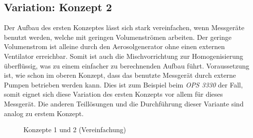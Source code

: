 \subsection{Variation: Konzept 2}
Der Aufbau des ersten Konzeptes l\"{a}sst sich stark vereinfachen, wenn Messger\"{a}te benutzt werden, welche mit geringen Volumenstr\"{o}men arbeiten. Der geringe Volumenstrom ist alleine durch den Aerosolgenerator ohne einen externen Ventilator erreichbar. Somit ist auch die Mischvorrichtung zur Homogenisierung \"{u}berfl\"{u}ssig, was zu einem einfacher zu berechnenden Aufbau f\"{u}hrt. Voraussetzung ist, wie schon im oberen Konzept, dass das benutzte Messger\"{a}t durch externe Pumpen betrieben werden kann. Dies ist zum Beispiel beim \textit{OPS 3330} der Fall, somit eignet sich diese Variation des ersten Konzepts vor allem f\"{u}r dieses Messger\"{a}t. Die anderen Teill\"{o}sungen und die Durchf\"{u}hrung dieser Variante sind analog zu erstem Konzept.
\begin{figure}[H]
        \myfloatalign
         \quad
        \caption[Konzepte 1 und 2 (Vereinfachung)]
        {Konzepte 1 und 2 (Vereinfachung)}
        \label{fig:concepts_1_2}
\end{figure}

